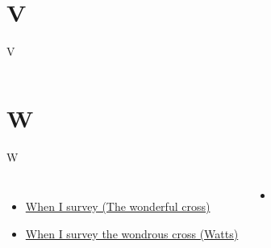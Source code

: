 \documentclass{beamer}
\begin{document}
\section{V}

\begin{frame}{V}
\begin{columns}

    


    


\end{columns}

\end{frame}

\section{W}

\begin{frame}{W}
\begin{columns}
        \begin{itemize}
    \item \hyperlink{The wonderful cross['When I survey'](Tomlin)}{When I survey (The wonderful cross)} \phantom{}
    \item \hyperlink{When I survey the wondrous cross[](Watts)}{When I survey the wondrous cross (Watts)} \phantom{}
\end{itemize}
        \begin{itemize}
            \item[] \phantom{1}\end{itemize}


\end{columns}

\end{frame}
\end{document}
